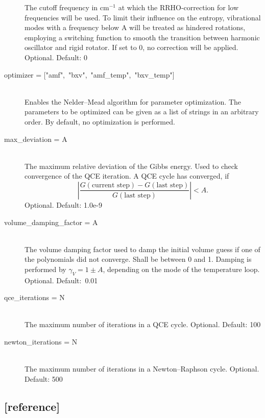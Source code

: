 \documentclass{scrartcl}
\begin{document}
\begin{description}
        The cutoff frequency in cm$^{-1}$ at which the RRHO-correction for low frequencies will be used.
        To limit their influence on the entropy, vibrational modes with a frequency below A will be treated as 
        hindered rotations, employing a switching function to smooth the transition between harmonic oscillator 
        and rigid rotator. If set to 0, no correction will be applied.
        Optional. Default: 0
    \item[optimizer = \mbox{["amf", "bxv", "amf\_temp", "bxv\_temp"]}] \hfill \\
        Enables the Nelder--Mead algorithm for parameter optimization.
        The parameters to be optimized can be given as a list of strings in an arbitrary order.
        By default, no optimization is performed.
    \item[max\_deviation = A] \hfill \\
        The maximum relative deviation of the Gibbs energy.
        Used to check convergence of the QCE iteration.
        A QCE cycle has converged, if \[\left|\frac{G(\text{current step}) - G(\text{last step})}{G(\text{last step})}\right| < A.\]
        Optional. Default: 1.0e-9
        \vspace{0.1cm}
    \item[volume\_damping\_factor = A] \hfill \\
        The volume damping factor used to damp the initial volume guess if one of the polynomials did not converge.
        Shall be between 0 and 1.
        Damping is performed by $\gamma_V = 1 \pm A$, depending on the mode of the temperature loop.
        Optional. Default:~0.01
        \vspace{0.1cm}
    \item[qce\_iterations = N] \hfill \\
        The maximum number of iterations in a QCE cycle.
        Optional. Default: 100
        \vspace{0.1cm}
    \item[newton\_iterations = N] \hfill \\
        The maximum number of iterations in a Newton--Raphson cycle.
        Optional. Default: 500
\end{description}

\subsection*{[reference]}
\vspace{-0.3cm}
\end{document}

